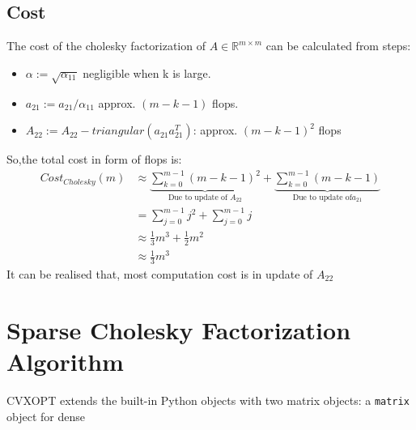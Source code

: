 \subsection*{Cost}
The cost of the cholesky factorization of $A\in \mathbb{R}^{m\times m}$ can be calculated from steps:
\begin{itemize}
	\item $\alpha := \sqrt{\alpha_{11}}$ negligible when k is large.
	\item $a_21 := a_{21}/\alpha_{11}$ approx. $(m-k-1)$ flops.
	\item $A_{22}:=A_{22}-triangular(a_{21}a_{21}^T)$: approx. $(m-k-1)^2$ flops
\end{itemize}
So,the total cost in form of flops is:
\begin{equation*}
	\begin{aligned}
		Cost_{Cholesky}(m) &\approx \underbrace{\sum_{k=0}^{m-1}{(m-k-1)^2} }_\textrm{Due to update of $A_{22}$} + \underbrace{\sum_{k=0}^{m-1}{(m-k-1)}}_\textrm{Due to update of$a_{21}$}\\
		&=\sum_{j=0}^{m-1}{j^2}+\sum_{j=0}^{m-1}{j}\\
		&\approx \frac{1}{3}m^3+\frac{1}{2}m^2\\
		&\approx \frac{1}{3}m^3
	\end{aligned}
\end{equation*}
It can be realised that, most computation cost is in update of $A_{22}$


\section{Sparse Cholesky Factorization Algorithm}

CVXOPT extends the built-in Python objects with two matrix objects: a {\color{red}\texttt{matrix}} object for dense 
















































